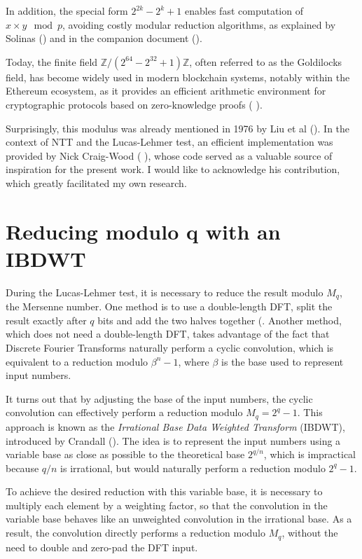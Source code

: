 \documentclass{article}
\begin{document}
In addition, the special form $2^{2k} - 2^k + 1$ enables fast computation of $x\times y \mod p$, avoiding costly modular reduction algorithms, as explained by Solinas (\cite{Sol99}) and in the companion document (\cite{LucasNTT_documents}).

Today, the finite field $\mathbb{Z}/(2^{64} - 2^{32} + 1)\mathbb{Z}$, often referred to as the Goldilocks field, has become widely used in modern blockchain systems, notably within the Ethereum ecosystem, as it provides an efficient arithmetic environment for cryptographic protocols based on zero-knowledge proofs (\cite{zk1} \cite{zk2} \cite{zk3}).
 
Surprisingly, this modulus was already mentioned in 1976 by Liu et al (\cite{LRT76}). In the context of NTT and the Lucas-Lehmer test, an efficient implementation was provided by Nick Craig-Wood (\cite{ncw94} \cite{ncw14}), whose code served as a valuable source of inspiration for the present work. I would like to acknowledge his contribution, which greatly facilitated my own research.

\section{Reducing modulo q with an IBDWT}

During the Lucas-Lehmer test, it is necessary to reduce the result modulo $M_q$, the Mersenne number. One method is to use a double-length DFT, split the result exactly after $q$ bits and add the two halves together (\cite{Sol99}. Another method, which does not need a double-length DFT, takes advantage of the fact that Discrete Fourier Transforms naturally perform a cyclic convolution, which is equivalent to a reduction modulo $\beta^n - 1$, where $\beta$ is the base used to represent input numbers.

It turns out that by adjusting the base of the input numbers, the cyclic convolution can effectively perform a reduction modulo $M_q = 2^q - 1$. This approach is known as the \textit{Irrational Base Data Weighted Transform} (IBDWT), introduced by Crandall (\cite{CF94}). The idea is to represent the input numbers using a variable base as close as possible to the theoretical base $2^{q/n}$, which is impractical because $q/n$ is irrational, but would naturally perform a reduction modulo $2^q - 1$.

To achieve the desired reduction with this variable base, it is necessary to multiply each element by a weighting factor, so that the convolution in the variable base behaves like an unweighted convolution in the irrational base. As a result, the convolution directly performs a reduction modulo $M_q$, without the need to double and zero-pad the DFT input.
\end{document}
